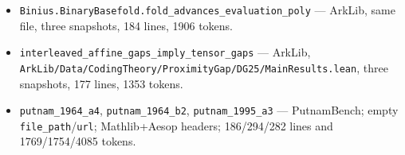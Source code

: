 \documentclass{article}
\begin{document}
\begin{itemize}
  \item \texttt{Binius.BinaryBasefold.fold\_advances\_evaluation\_poly} --- ArkLib, same file, three snapshots, 184 lines, 1906 tokens.
  \item \texttt{interleaved\_affine\_gaps\_imply\_tensor\_gaps} --- ArkLib, \texttt{ArkLib/Data/\allowbreak CodingTheory/ProximityGap/DG25/MainResults.lean}, three snapshots, 177 lines, 1353 tokens.
  \item \texttt{putnam\_1964\_a4}, \texttt{putnam\_1964\_b2}, \texttt{putnam\_1995\_a3} --- PutnamBench; empty \texttt{file\_path}/\texttt{url}; Mathlib+Aesop headers; 186/294/282 lines and 1769/1754/4085 tokens.
\end{itemize}
\end{document}
